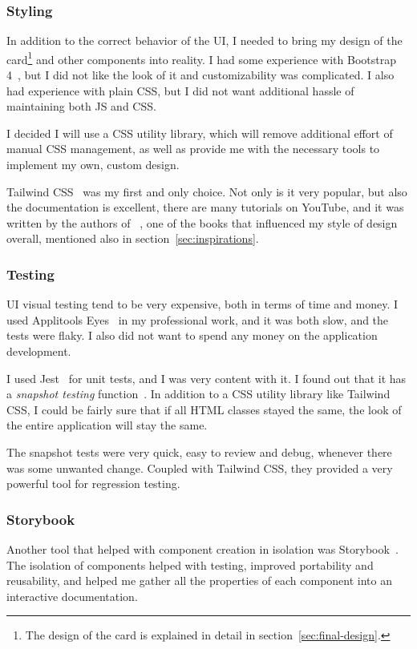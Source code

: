 \subsubsection{Styling}\label{sec:ui-styling}

In addition to the correct behavior of the UI,
I needed to bring my design of the card\footnote{
  The design of the card
  is explained in detail
  in section~\ref{sec:final-design}.
} and other components
into reality.
I had some experience with Bootstrap 4~\cite{otto_bootstrap_2018},
but I did not like the look of it
and customizability was complicated.
I also had experience with plain CSS,
but I did not want additional hassle
of maintaining both JS and CSS.

I decided I will use a CSS utility library,
which will remove additional effort
of manual CSS management,
as well as provide me with the necessary tools
to implement my own, custom design.

Tailwind CSS~\cite{wathan_tailwind_2022}
was my first and only choice.
Not only is it very popular,
but also the documentation is excellent,
there are many tutorials on YouTube,
and it was written by the authors
of ~\cite{wathan_refactoring_2018},
one of the books that influenced
my style of design overall,
mentioned also in section~\ref{sec:inspirations}.

\subsubsection{Testing}\label{sec:ui-testing}

UI visual testing tend to be very expensive,
both in terms of time and money.
I used Applitools Eyes~\cite{applitools_applitools_2022}
in my professional work,
and it was both slow,
and the tests were flaky.
I also did not want to spend any money
on the application development.

I used Jest~\cite{bekkhus_jest_2022} for unit tests,
and I was very content with it.
I found out that it has
a \emph{snapshot testing} function~\cite{bekkhus_snapshot_2022}.
In addition to a CSS utility library
like Tailwind CSS,
I could be fairly sure
that if all HTML classes stayed the same,
the look of the entire application
will stay the same.

The snapshot tests were very quick,
easy to review and debug,
whenever there was some unwanted change.
Coupled with Tailwind CSS,
they provided a very powerful tool
for regression testing.

\subsubsection{Storybook}\label{sec:storybook}

Another tool that helped with
component creation in isolation
was Storybook~\cite{shilman_storybook_2022}.
The isolation of components
helped with testing,
improved portability and reusability,
and helped me gather all the properties
of each component into an interactive
documentation.
